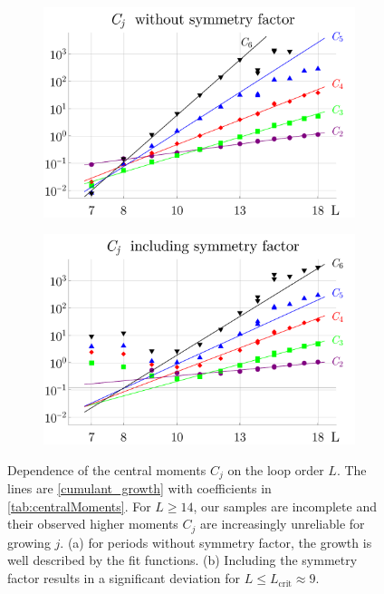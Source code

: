 \documentclass[11pt,a4paper]{article}
\renewcommand{\|}{\rule[-0.4ex]{0.2ex}{1.2em}}
\begin{document}
\begin{figure}[htb]
	\begin{subfigure}[b]{.48 \textwidth}
		\includegraphics[width=\linewidth]{Cj_without_symfactor}
		\subcaption{}
	\end{subfigure}
	\begin{subfigure}[b]{.48 \textwidth}
		\includegraphics[width=\linewidth]{Cj_with_symfactor}
		\subcaption{}
	\end{subfigure}
	
	\caption{Dependence of the central moments $C_j$ on the loop order $L$. The lines are  \cref{cumulant_growth} with coefficients in \cref{tab:centralMoments}. For $L\geq 14$, our samples are incomplete and their observed higher moments $C_j$ are increasingly unreliable for growing $j$. (a) for periods without symmetry factor, the growth is well described by the fit functions. (b) Including the symmetry factor results in a significant deviation for $L\leq L_\text{crit}\approx 9$.   }
	\label{fig:Cj_growth}
\end{figure}
\end{document}
